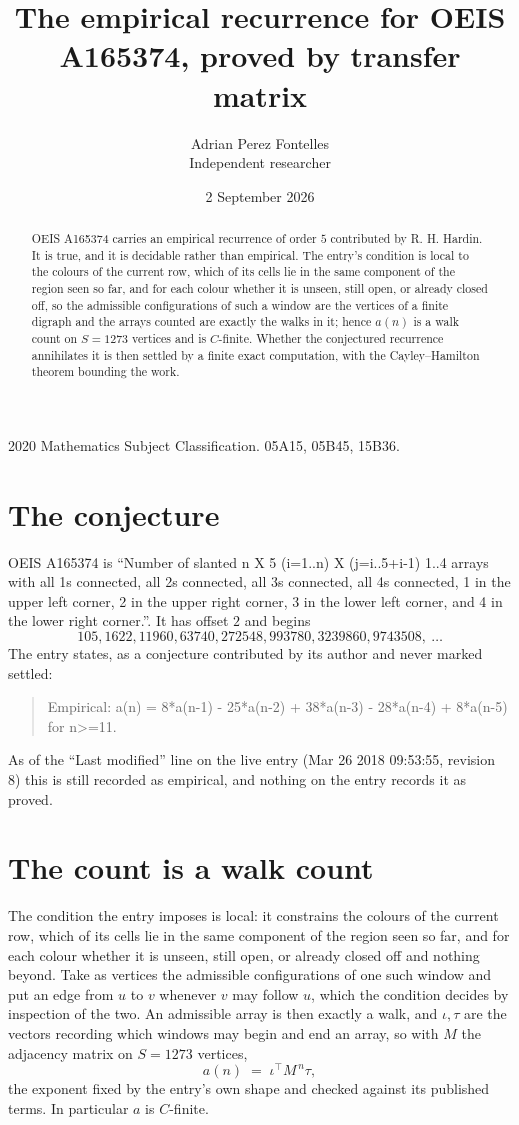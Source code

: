 \documentclass[11pt,a4paper]{article}
\title{The empirical recurrence for OEIS A165374, proved by transfer matrix}
\author{Adrian Perez Fontelles\\ \small Independent researcher}
\date{2 September 2026}
\theoremstyle{plain}
\theoremstyle{definition}
\begin{document}
\maketitle

\begin{abstract}
OEIS A165374 carries an empirical recurrence of order $5$ contributed by R. H. Hardin. It is
true, and it is decidable rather than empirical. The entry's condition is local to the colours of the current row, which of its cells lie in the same component of the region seen so far, and for each colour whether it is unseen, still open, or already closed off, so
the admissible configurations of such a window are the vertices of a finite digraph and the
arrays counted are exactly the walks in it; hence $a(n)$ is a walk count on $S=1273$ vertices
and is $C$-finite. Whether the conjectured recurrence annihilates it is then settled by a
finite exact computation, with the Cayley--Hamilton theorem bounding the work.
\end{abstract}

\noindent\small 2020 Mathematics Subject Classification. 05A15, 05B45, 15B36.\normalsize

\section{The conjecture}

OEIS A165374 is ``Number of slanted n X 5 (i=1..n) X (j=i..5+i-1) 1..4 arrays with all 1s connected, all 2s connected, all 3s connected, all 4s connected, 1 in the upper left corner, 2 in the upper right corner, 3 in the lower left corner, and 4 in the lower right corner.''. It has offset $2$ and begins
\[
105, 1622, 11960, 63740, 272548, 993780, 3239860, 9743508,\ \dots
\]
The entry states, as a conjecture contributed by its author and never marked settled:
\begin{quote}
Empirical: a(n) = 8*a(n-1) - 25*a(n-2) + 38*a(n-3) - 28*a(n-4) + 8*a(n-5) for n>=11.
\end{quote}
As of the ``Last modified'' line on the live entry (Mar 26 2018 09:53:55, revision 8) this is still
recorded as empirical, and nothing on the entry records it as proved.

\section{The count is a walk count}

The condition the entry imposes is local: it constrains the colours of the current row, which of its cells lie in the same component of the region seen so far, and for each colour whether it is unseen, still open, or already closed off and nothing beyond. Take as vertices the admissible configurations of one such window and put an edge from $u$ to $v$ whenever $v$ may follow $u$, which the condition decides by inspection of the two.
An admissible array is then exactly a walk, and $\iota,\tau$ are the vectors recording which windows may begin and end an array, so with $M$ the adjacency matrix on $S=1273$ vertices,
\[
a(n)\;=\;\iota^{\!\top}M^{\,n}\tau ,
\]
the exponent fixed by the entry's own shape and checked against its published terms. In
particular $a$ is $C$-finite.
\end{document}
